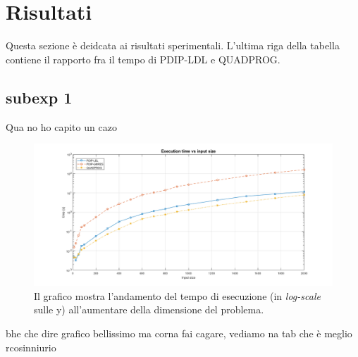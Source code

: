 \section{Risultati}
Questa sezione è deidcata ai risultati sperimentali. L'ultima riga della tabella contiene il rapporto fra il tempo di PDIP-LDL e QUADPROG.
\subsection*{subexp 1}

Qua no ho capito un cazo 

\begin{figure}[!h]
    \centering
    \includegraphics[width=\textwidth]{img/MU1.png}
    \caption{Il grafico mostra l'andamento del tempo di esecuzione (in \textit{log-scale} sulle y) all'aumentare della dimensione del problema. \label{fig:exp1}}
\end{figure}

bhe che dire grafico bellissimo ma corna fai cagare, vediamo na tab che è meglio rcosinniurio

